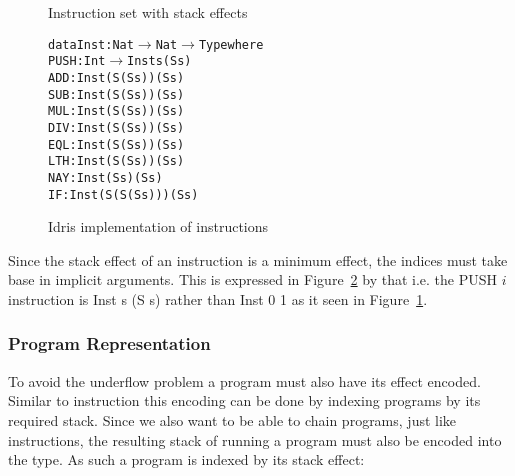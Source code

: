 \begin{figure}
\caption{Instruction set with stack effects}
\label{fig:inst_set_with_effect}
\end{figure}

\begin{figure}
\begin{alltt}
data Inst : Nat \(\rightarrow\) Nat \(\rightarrow\) Type where
  PUSH : Int \(\rightarrow\) Inst          s    (S s)
  ADD  :        Inst    (S (S s))  (S s)
  SUB  :        Inst    (S (S s))  (S s)
  MUL  :        Inst    (S (S s))  (S s)
  DIV  :        Inst    (S (S s))  (S s)
  EQL  :        Inst    (S (S s))  (S s)
  LTH  :        Inst    (S (S s))  (S s)
  NAY  :        Inst       (S s)   (S s)
  IF   :        Inst (S (S (S s))) (S s)
\end{alltt}
\caption{Idris implementation of instructions}
\label{fig:idris_inst_set}
\end{figure}

Since the stack effect of an instruction is a minimum effect, the indices must take base in implicit arguments. This is expressed in Figure~\ref{fig:idris_inst_set} by that i.e. the PUSH $i$ instruction is Inst s (S s) rather than Inst 0 1 as it seen in Figure~\ref{fig:inst_set_with_effect}. 

\subsubsection{Program Representation}
To avoid the underflow problem a program must also have its effect encoded. Similar to instruction this encoding can be done by indexing programs by its required stack. Since we also want to be able to chain programs, just like instructions, the resulting stack of running a program must also be encoded into the type. As such a program is indexed by its stack effect:

